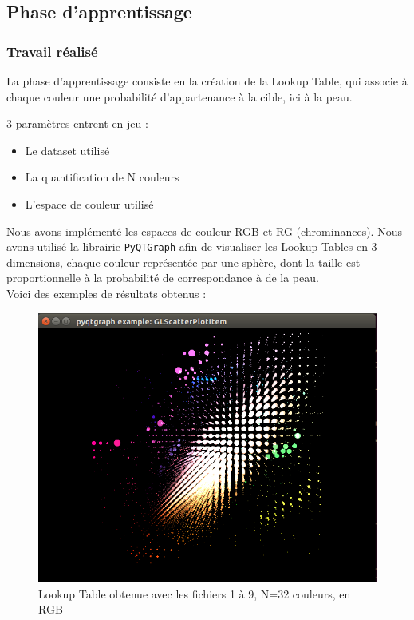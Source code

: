 \documentclass[a4paper,11pt]{article}
\begin{document}
\subsection{Phase d'apprentissage}

\subsubsection{Travail réalisé}

La phase d'apprentissage consiste en la création de la Lookup Table, qui associe à chaque couleur une probabilité d'appartenance à la cible, ici à la peau.

3 paramètres entrent en jeu :

\begin{itemize}
    \item Le dataset utilisé
    \item La quantification de N couleurs 
    \item L'espace de couleur utilisé\\
\end{itemize}

Nous avons implémenté les espaces de couleur RGB et RG (chrominances). Nous avons utilisé la librairie \verb!PyQTGraph! afin de visualiser les Lookup Tables en 3 dimensions, chaque couleur représentée par une sphère, dont la taille est proportionnelle à la probabilité de correspondance à de la peau.\\

Voici des exemples de résultats obtenus :

\begin{figure}[H]
\begin{center}
    \includegraphics[scale=0.5]{lT_1_9_8_RGB.png}
    \caption{Lookup Table obtenue avec les fichiers 1 à 9, N=32 couleurs, en RGB}
\end{center}
\end{figure}
\end{document}
